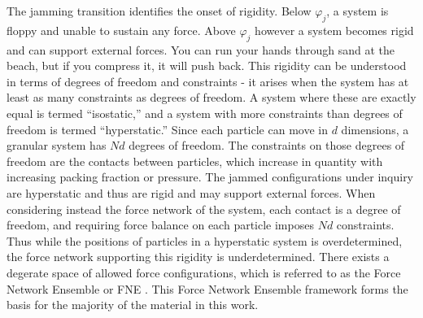 The jamming transition identifies the onset of rigidity. Below $\varphi_j$, a system is floppy and unable to sustain any force. Above $\varphi_j$ however a system becomes rigid and can support external forces. You can run your hands through sand at the beach, but if you compress it, it will push back. This rigidity can be understood in terms of degrees of freedom and constraints - it arises when the system has at least as many constraints as degrees of freedom. A system where these are exactly equal is termed ``isostatic,'' and a system with more constraints than degrees of freedom is termed ``hyperstatic.'' Since each particle can move in $d$ dimensions, a granular system has $Nd$ degrees of freedom. The constraints on those degrees of freedom are the contacts between particles, which increase in quantity with increasing packing fraction or pressure. The jammed configurations under inquiry are hyperstatic and thus are rigid and may support external forces. When considering instead the force network of the system, each contact is a degree of freedom, and requiring force balance on each particle imposes $Nd$ constraints. Thus while the positions of particles in a hyperstatic system is overdetermined, the force network supporting this rigidity is underdetermined. There exists a degerate space of allowed force configurations, which is referred to as the Force Network Ensemble or FNE \cite{snoeijer_force_2004,tighe_force_2010}. This Force Network Ensemble framework forms the basis for the majority of the material in this work.

